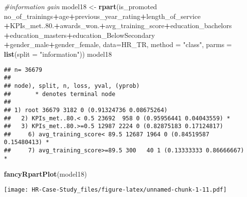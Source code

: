 \documentclass[
]{article}
\newenvironment{Shaded}{\begin{snugshade}}{\end{snugshade}}
\newcommand{\CommentTok}[1]{\textcolor[rgb]{0.56,0.35,0.01}{\textit{#1}}}
\newcommand{\DataTypeTok}[1]{\textcolor[rgb]{0.13,0.29,0.53}{#1}}
\newcommand{\FloatTok}[1]{\textcolor[rgb]{0.00,0.00,0.81}{#1}}
\newcommand{\KeywordTok}[1]{\textcolor[rgb]{0.13,0.29,0.53}{\textbf{#1}}}
\newcommand{\NormalTok}[1]{#1}
\newcommand{\OperatorTok}[1]{\textcolor[rgb]{0.81,0.36,0.00}{\textbf{#1}}}
\newcommand{\StringTok}[1]{\textcolor[rgb]{0.31,0.60,0.02}{#1}}
\begin{document}
\begin{Shaded}
\begin{Highlighting}[]
\CommentTok{#information gain }
\NormalTok{model18 <-}\StringTok{ }\KeywordTok{rpart}\NormalTok{(is_promoted }\OperatorTok{~}\StringTok{ }\NormalTok{no_of_trainings}\OperatorTok{+}\NormalTok{age}\OperatorTok{+}\NormalTok{previous_year_rating}\OperatorTok{+}\NormalTok{length_of_service}
               \OperatorTok{+}\NormalTok{KPIs_met..}\FloatTok{80.}\OperatorTok{+}\NormalTok{awards_won.}\OperatorTok{+}\NormalTok{avg_training_score}\OperatorTok{+}\NormalTok{education_bachelors}
               \OperatorTok{+}\NormalTok{education_masters}\OperatorTok{+}\NormalTok{education_BelowSecondary}
               \OperatorTok{+}\NormalTok{gender_male}\OperatorTok{+}\NormalTok{gender_female,  }
               \DataTypeTok{data=}\NormalTok{HR_TR, }
               \DataTypeTok{method =} \StringTok{"class"}\NormalTok{,}
               \DataTypeTok{parms =} \KeywordTok{list}\NormalTok{(}\DataTypeTok{split =} \StringTok{"information"}\NormalTok{))}
\NormalTok{model18}
\end{Highlighting}
\end{Shaded}

\begin{verbatim}
## n= 36679 
## 
## node), split, n, loss, yval, (yprob)
##       * denotes terminal node
## 
## 1) root 36679 3182 0 (0.91324736 0.08675264)  
##   2) KPIs_met..80.< 0.5 23692  958 0 (0.95956441 0.04043559) *
##   3) KPIs_met..80.>=0.5 12987 2224 0 (0.82875183 0.17124817)  
##     6) avg_training_score< 89.5 12687 1964 0 (0.84519587 0.15480413) *
##     7) avg_training_score>=89.5 300   40 1 (0.13333333 0.86666667) *
\end{verbatim}

\begin{Shaded}
\begin{Highlighting}[]
\KeywordTok{fancyRpartPlot}\NormalTok{(model18)}
\end{Highlighting}
\end{Shaded}

\texttt{[image: HR-Case-Study\_files/figure-latex/unnamed-chunk-1-11.pdf]}

\begin{Shaded}
\end{Shaded}
\end{document}
